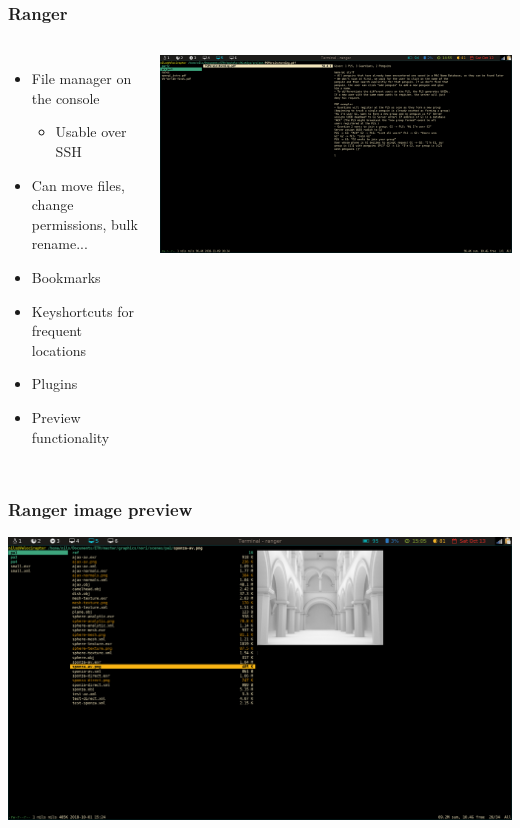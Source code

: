     \begin{frame}[t, fragile]
	    \frametitle{Ranger}
	    \begin{columns}[T]
		    \begin{itemize}
			    \item File manager on the console
				    \begin{itemize}
					    \item Usable over SSH
				    \end{itemize}
			    \item Can move files, change permissions, bulk rename...
			    \item Bookmarks
			    \item Keyshortcuts for frequent locations
			    \item Plugins
			    \item Preview functionality
		    \end{itemize}
		    \includegraphics[width=1.0\columnwidth]{img/ranger.png}
	    \end{columns}
    \end{frame}

    \begin{frame}[t, fragile]
	    \frametitle{Ranger image preview}
	    \includegraphics[width=0.7\columnwidth]{img/ranger_img_preview.png}
    \end{frame}


